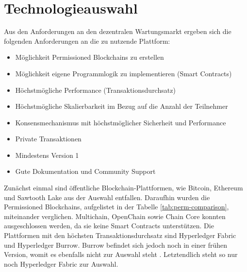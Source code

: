 \section{Technologieauswahl}
Aus den Anforderungen an den dezentralen Wartungsmarkt ergeben sich die folgenden Anforderungen an die zu nutzende Plattform: 

\begin{itemize}
    \item Möglichkeit Permissioned Blockchains zu erstellen
    \item Möglichkeit eigene Programmlogik zu implementieren (Smart Contracts)
    \item Höchstmögliche Performance (Transaktionsdurchsatz)
    \item Höchstmögliche Skalierbarkeit im Bezug auf die Anzahl der Teilnehmer
    \item Konsensmechanismus mit höchstmöglicher Sicherheit und Performance
    \item Private Transaktionen   
    \item Mindestens Version 1
    \item Gute Dokumentation und Community Support
\end{itemize}

Zunächst einmal sind öffentliche Blockchain-Plattformen, wie Bitcoin, Ethereum und Sawtooth Lake aus der Auswahl entfallen. Daraufhin wurden die Permissioned Blockchains, aufgelistet in der Tabelle \ref{tab:perm-comparison}, miteinander verglichen. Multichain, OpenChain sowie Chain Core konnten ausgeschlossen werden, da sie keine Smart Contracts unterstützen. Die Plattformen mit den höchsten Transaktionsdurchsatz sind Hyperledger Fabric und Hyperledger Burrow. Burrow befindet sich jedoch noch in einer frühen Version, womit es ebenfalls nicht zur Auswahl steht \cite{HyperledgerFabricTeamHyperledgerFabricReleases2018}. Letztendlich steht so nur noch Hyperledger Fabric zur Auswahl. 

